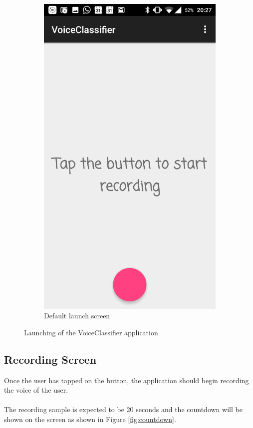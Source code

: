 \documentclass[letterpaper, 12 pt]{report}
\begin{document}
\begin{figure}[H]
\begin{subfigure}{.5\textwidth}
  \includegraphics[width=.8\linewidth]{Photos/Opening_App_2.png}
  \caption{Default launch screen}
  \label{fig:sub2}
\end{subfigure}
\caption{Launching of the VoiceClassifier application}
\label{fig:launch}
\end{figure}

\newpage

\subsection{Recording Screen}
Once the user has tapped on the button, the application should begin recording the voice of the user.\\ \\ The recording sample is expected to be 20 seconds and the countdown will be shown on the screen as shown in Figure \ref{fig:countdown}.\\ \\ \\ 
\end{document}
